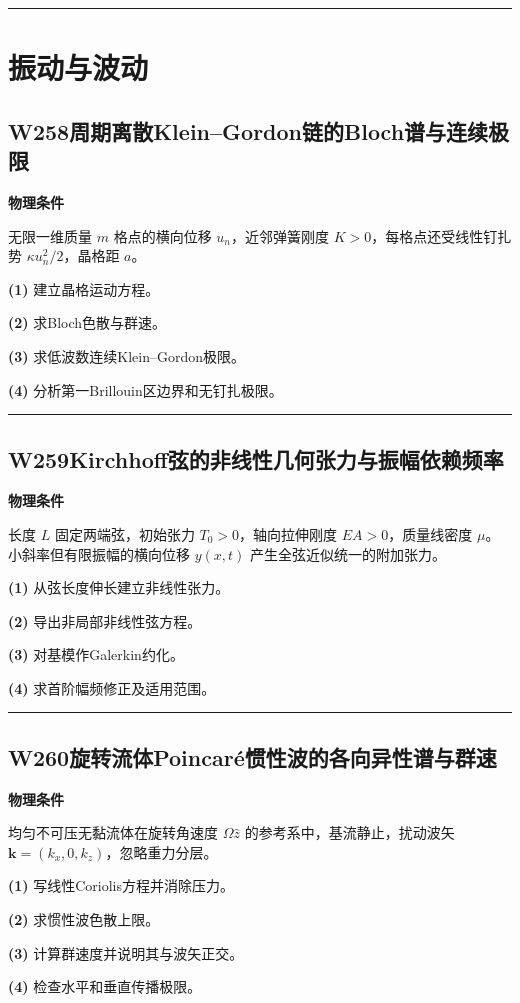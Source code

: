\documentclass[UTF8,a4paper,11pt,oneside,openany]{ctexbook}
\begin{document}
\par\bigskip\hrule\bigskip
\chapter{振动与波动}
\section*{W258\quad 周期离散Klein–Gordon链的Bloch谱与连续极限}
\textbf{物理条件}\par 无限一维质量 \(m\) 格点的横向位移 \(u_n\)，近邻弹簧刚度 \(K>0\)，每格点还受线性钉扎势 \(\kappa u_n^2/2\)，晶格距 \(a\)。
\par\noindent\textbf{(1)} 建立晶格运动方程。
\par\noindent\textbf{(2)} 求Bloch色散与群速。
\par\noindent\textbf{(3)} 求低波数连续Klein–Gordon极限。
\par\noindent\textbf{(4)} 分析第一Brillouin区边界和无钉扎极限。

\par\bigskip\hrule\bigskip
\section*{W259\quad Kirchhoff弦的非线性几何张力与振幅依赖频率}
\textbf{物理条件}\par 长度 \(L\) 固定两端弦，初始张力 \(T_0>0\)，轴向拉伸刚度 \(EA>0\)，质量线密度 \(\mu\)。小斜率但有限振幅的横向位移 \(y(x,t)\) 产生全弦近似统一的附加张力。
\par\noindent\textbf{(1)} 从弦长度伸长建立非线性张力。
\par\noindent\textbf{(2)} 导出非局部非线性弦方程。
\par\noindent\textbf{(3)} 对基模作Galerkin约化。
\par\noindent\textbf{(4)} 求首阶幅频修正及适用范围。

\par\bigskip\hrule\bigskip
\section*{W260\quad 旋转流体Poincaré惯性波的各向异性谱与群速}
\textbf{物理条件}\par 均匀不可压无黏流体在旋转角速度 \(\Omega\hat z\) 的参考系中，基流静止，扰动波矢 \(\boldsymbol k=(k_x,0,k_z)\)，忽略重力分层。
\par\noindent\textbf{(1)} 写线性Coriolis方程并消除压力。
\par\noindent\textbf{(2)} 求惯性波色散上限。
\par\noindent\textbf{(3)} 计算群速度并说明其与波矢正交。
\par\noindent\textbf{(4)} 检查水平和垂直传播极限。
\end{document}
